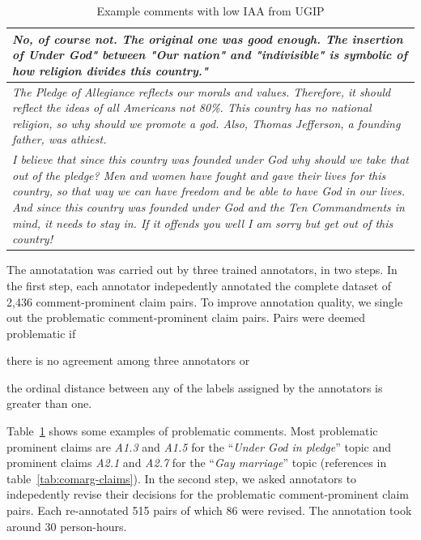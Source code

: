 \begin{table}
\centering
{\small
\begin{tabular}{@{}p{\columnwidth}@{}}
\toprule
\textit{
\normalsize{%
No, of course not. The original one was good enough.  The insertion of Under
God" between "Our nation" and "indivisible" is symbolic of how religion divides
this country."}
}\\
\midrule
\normalsize{%
\textit{
The Pledge of Allegiance reflects our morals and values. Therefore, it should
reflect the ideas of all Americans not 80\%. This country has no national
religion, so why should we promote a god. Also, Thomas Jefferson, a founding
father, was athiest.
}
}
\\
\midrule
\normalsize{%
\textit{
I believe that since this country was founded under God why should we take that
out of the pledge? Men and women have fought and gave their lives for this
country, so that way we can have freedom and be able to have God in our lives.
And since this country was founded under God and the Ten Commandments in mind,
it needs to stay in. If it offends you well I am sorry but get out of this
country!}
}\\
\bottomrule
\end{tabular}
}
\caption{Example comments with low IAA from UGIP}
\label{tab:problematic-comments}
\end{table}

The annotatation was carried out by three trained annotators, in two
steps. 
In the first step, each annotator indepedently annotated the complete dataset
of 2,436 comment-prominent claim pairs. 
To improve annotation quality, we single out the problematic comment-prominent claim
pairs. 
Pairs were deemed problematic if 
\begin{enumerate*} 
\item there is no agreement among three annotators or
\item the ordinal distance between any of the labels assigned
by the annotators is greater than one. 
\end{enumerate*}
Table~\ref{tab:problematic-comments} shows some examples of problematic comments. 
Most problematic prominent claims are \textit{A1.3} and \textit{A1.5} for the 
``\emph{Under God in pledge}'' topic
and prominent claims \textit{A2.1} and \textit{A2.7} for the ``\emph{Gay marriage}''
topic (references
in table~\ref{tab:comarg-claims}). 
In the second step, we asked annotators to indepedently revise 
their decisions for the problematic comment-prominent claim pairs. 
Each re-annotated 515 pairs of which 86 were revised. 
The annotation took around 30 person-hours. 

